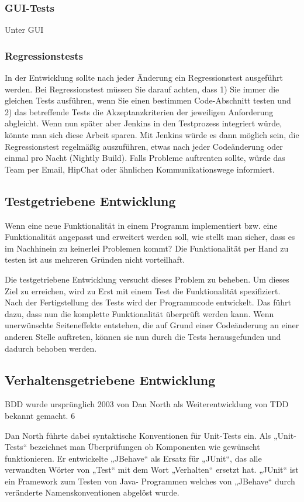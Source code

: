 \subsubsection{GUI-Tests}
Unter GUI

\subsubsection{Regressionstests}
In der Entwicklung sollte nach jeder Änderung ein Regressionstest ausgeführt werden. Bei Regressionstest
müssen Sie darauf achten, dass 1) Sie immer die gleichen Tests ausführen, wenn Sie einen
bestimmen Code-Abschnitt testen und 2) das betreffende Tests die Akzeptanzkriterien der jeweiligen
Anforderung abgleicht. Wenn nun später aber Jenkins in den Testprozess integriert würde, könnte
man sich diese Arbeit sparen. Mit Jenkins würde es dann möglich sein, die Regressionstest regelmäßig
auszuführen, etwas nach jeder Codeänderung oder einmal pro Nacht (Nightly Build). Falls Probleme auftrenten sollte, würde das Team per Email, HipChat oder ähnlichen Kommunikationswege informiert.


\subsection{Testgetriebene Entwicklung}
Wenn eine neue Funktionalität in einem Programm implementiert bzw. eine Funktionalität angepasst und erweitert werden soll, wie stellt man sicher, dass es im Nachhinein
zu keinerlei Problemen kommt? Die Funktionalität per Hand zu testen ist aus mehreren Gründen nicht vorteilhaft.

Die testgetriebene Entwicklung versucht dieses Problem zu beheben. Um dieses Ziel zu erreichen, wird zu Erst mit einem Test die Funktionalität spezifiziert. Nach der
Fertigstellung des Tests wird der Programmcode entwickelt. Das führt dazu, dass nun die komplette Funktionalität überprüft werden kann. Wenn unerwünschte Seiteneffekte 
entstehen, die auf Grund einer Codeänderung an einer anderen Stelle auftreten, können sie nun durch die Tests herausgefunden und dadurch
behoben werden.

\subsection{Verhaltensgetriebene Entwicklung}
BDD wurde ursprünglich 2003 von Dan North als Weiterentwicklung von TDD bekannt gemacht. 6

Dan North führte dabei syntaktische Konventionen für Unit-Tests ein. Als „Unit-Tests“ bezeichnet man Überprüfungen ob Komponenten wie gewünscht funktionieren. Er
entwickelte „JBehave“ als Ersatz für „JUnit“, das alle verwandten Wörter von „Test“ mit dem Wort „Verhalten“ ersetzt hat. „JUnit“ ist ein Framework zum Testen von Java-
Programmen welches von „JBehave“ durch veränderte Namenskonventionen abgelöst wurde.

